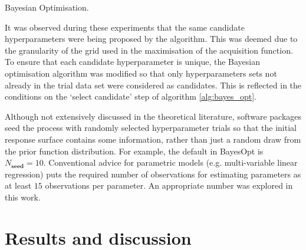 \begin{algorithm}\label{alg:bayes_opt}
\BlankLine
{}
\caption{Bayesian Optimisation.}
\end{algorithm}

It was observed during these experiments that the same candidate hyperparameters were being proposed by the algorithm. This was deemed due to the granularity of the grid used in the maximisation of the acquisition function. To ensure that each candidate hyperparameter is unique, the Bayesian optimisation algorithm was modified so that only  hyperparameters sets not already in the trial data set were considered as candidates. This is reflected in the conditions on the `select candidate' step of algorithm \ref{alg:bayes_opt}.

Although not extensively discussed in the theoretical literature, software packages seed the process with randomly selected hyperparameter trials so that the initial response surface contains some information, rather than just a random draw from the prior function distribution. For example, the default in BayesOpt\cite{martinez-cantinBayesOptBayesianOptimization2014} is $N_{\mathbf{seed}} = 10$. Conventional advice  for parametric models (e.g. multi-variable linear regression) puts the required number of observations for estimating parameters as at least $15$ observations per parameter\cite{harrelRegressionModelingStrategies2015}. An appropriate number was explored in this work. 


\section{Results and discussion}\label{sec:msm_results}
